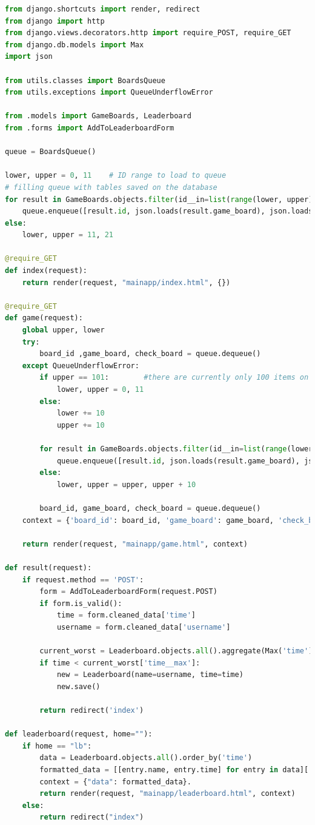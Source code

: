\documentclass[12pt, a4paper]{report}
\begin{document}
    \begin{lstlisting}[language=Python, caption=mainapp/views.py]
from django.shortcuts import render, redirect
from django import http
from django.views.decorators.http import require_POST, require_GET
from django.db.models import Max
import json

from utils.classes import BoardsQueue
from utils.exceptions import QueueUnderflowError

from .models import GameBoards, Leaderboard
from .forms import AddToLeaderboardForm

queue = BoardsQueue()

lower, upper = 0, 11    # ID range to load to queue
# filling queue with tables saved on the database
for result in GameBoards.objects.filter(id__in=list(range(lower, upper))):
    queue.enqueue([result.id, json.loads(result.game_board), json.loads(result.check_board)])
else:
    lower, upper = 11, 21

@require_GET
def index(request):
    return render(request, "mainapp/index.html", {})

@require_GET
def game(request):
    global upper, lower
    try:
        board_id ,game_board, check_board = queue.dequeue()
    except QueueUnderflowError:
        if upper == 101:        #there are currently only 100 items on the database, so it loops back to the starting.
            lower, upper = 0, 11
        else:
            lower += 10
            upper += 10

        for result in GameBoards.objects.filter(id__in=list(range(lower, upper))):  #loading new tables from database
            queue.enqueue([result.id, json.loads(result.game_board), json.loads(result.check_board)])
        else:
            lower, upper = upper, upper + 10

        board_id, game_board, check_board = queue.dequeue()
    context = {'board_id': board_id, 'game_board': game_board, 'check_board': check_board, 'form': AddToLeaderboardForm()}
    
    return render(request, "mainapp/game.html", context)

def result(request):
    if request.method == 'POST':
        form = AddToLeaderboardForm(request.POST)
        if form.is_valid():
            time = form.cleaned_data['time']
            username = form.cleaned_data['username']

        current_worst = Leaderboard.objects.all().aggregate(Max('time'))
        if time < current_worst['time__max']:
            new = Leaderboard(name=username, time=time)
            new.save()

        return redirect('index') 

def leaderboard(request, home=""):
    if home == "lb":
        data = Leaderboard.objects.all().order_by('time')
        formatted_data = [[entry.name, entry.time] for entry in data][:10]
        context = {"data": formatted_data}.
        return render(request, "mainapp/leaderboard.html", context)
    else:
        return redirect("index")
    \end{lstlisting}
\end{document}
